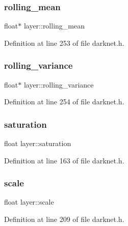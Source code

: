 \mbox{\label{structlayer_aadc24d03a6dbab21fcafad3d29bb1310}} 
\subsubsection{\texorpdfstring{rolling\_mean}{rolling\_mean}}
{\footnotesize\ttfamily float$\ast$ layer\+::rolling\+\_\+mean}



Definition at line 253 of file darknet.\+h.

\mbox{\label{structlayer_a316830907cb724b9304cea311c8d8dc5}} 
\subsubsection{\texorpdfstring{rolling\_variance}{rolling\_variance}}
{\footnotesize\ttfamily float$\ast$ layer\+::rolling\+\_\+variance}



Definition at line 254 of file darknet.\+h.

\mbox{\label{structlayer_a900c449abe20f24a3ab6f171679d12dd}} 
\subsubsection{\texorpdfstring{saturation}{saturation}}
{\footnotesize\ttfamily float layer\+::saturation}



Definition at line 163 of file darknet.\+h.

\mbox{\label{structlayer_a7225a2fa7d8cf13688e1c8a421f3ad7f}} 
\subsubsection{\texorpdfstring{scale}{scale}}
{\footnotesize\ttfamily float layer\+::scale}



Definition at line 209 of file darknet.\+h.

